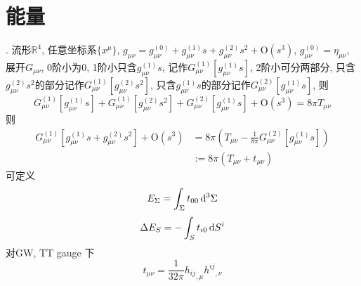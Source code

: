 \chapter{能量}

\cite{Wald1984}. 流形$\mathbb{R}^{4}$, 任意坐标系$\{x^\mu\}$, $g_{\mu\nu}=g^{(0)}_{\mu\nu}+g^{(1)}_{\mu\nu}s+g^{(2)}_{\mu\nu}s^2+\text{O}(s^3)$, $g^{(0)}_{\mu\nu}=\eta_{\mu\nu}$, 展开$G_{\mu\nu}$, 0阶小为$0$, 1阶小只含$g^{(1)}_{\mu\nu}s$, 记作$G_{\mu\nu}^{(1)}[g^{(1)}_{\mu\nu}s]$, 2阶小可分两部分, 只含$g^{(2)}_{\mu\nu}s^2$的部分记作$G_{\mu\nu}^{(1)}[g^{(2)}_{\mu\nu}s^2]$, 只含$g^{(1)}_{\mu\nu}s$的部分记作$G_{\mu\nu}^{(2)}[g^{(1)}_{\mu\nu}s]$, 则
\begin{equation}
    G_{\mu\nu}^{(1)}[g^{(1)}_{\mu\nu}s]+G_{\mu\nu}^{(1)}[g^{(2)}_{\mu\nu}s^2]+G_{\mu\nu}^{(2)}[g^{(1)}_{\mu\nu}s]+\text{O}(s^3)=8\pi T_{\mu\nu}
\end{equation}
则
\begin{align}
    G_{\mu\nu}^{(1)}[g^{(1)}_{\mu\nu}s+g^{(2)}_{\mu\nu}s^2]+\text{O}(s^3)&=8\pi (T_{\mu\nu}-\frac{1}{8\pi}G_{\mu\nu}^{(2)}[g^{(1)}_{\mu\nu}s])\\
    &:=8\pi (T_{\mu\nu}+t_{\mu\nu})
\end{align}
可定义
\begin{equation}
    E_{\Sigma}=\int_\Sigma t_{00}\,\mathrm{d}^3\Sigma
\end{equation}
\begin{equation}
    \Delta E_{S}=-\int_S t_{i0}\,\mathrm{d} S^i
\end{equation}
对GW, TT gauge 下
\begin{equation}
    t_{\mu\nu}=\frac{1}{32\pi}{h_{ij}}_{,\mu}{h^{ij}}_{,\nu}
\end{equation}
